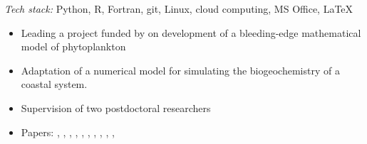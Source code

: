 \documentclass[
	a4paper,
]{fortysecondscv}
\begin{document}
{\Huge\color{maincolor}\cvname}
\vspace*{-10mm}

\cvsection{}
\begin{cvtable}[1.0]

	{\href{https://uol.de/en/icbm}{\color{pblue}{Uni. Oldenburg, Germany}}}
	{
	\textit{Tech stack:} Python, R, Fortran, git, Linux, cloud computing, MS Office, \LaTeX
	\begin{changemargin}{-45pt}{0pt}
	\begin{itemize}[topsep=0pt,itemsep=0pt,partopsep=0pt, parsep=0pt, leftmargin=*]
     \item Leading a project funded by \href{https://www.dfg.de/en}{\color{pblue}{DFG}} on development of a bleeding-edge mathematical model of phytoplankton %
     \item Adaptation of a numerical model for simulating the biogeochemistry of a coastal system.
     \item Supervision of two postdoctoral researchers
     \item Papers:
      \href{https://doi.org/10.1016/j.ecolmodel.2020.109401}{\color{pblue}{1}}, %
      \href{https://doi.org/10.1111/ele.13680}{\color{pblue}{2}},  %
      \href{https://doi.org/10.5194/gmd-14-6025-2021}{\color{pblue}{3}}, %
      \href{https://doi.org/10.3389/fmars.2021.675428}{\color{pblue}{4}}, %
      \href{https://doi.org/10.1002/lno.12005}{\color{pblue}{5}}, %
      \href{https://doi.org/10.3389/fmars.2022.975414}{\color{pblue}{6}}, %
      \href{https://doi.org/10.1101/2022.05.18.492269}{\color{pblue}{7}}, %
      \href{https://doi.org/10.1016/j.scitotenv.2022.158757}{\color{pblue}{8}}, %
      \href{https://doi.org/10.5194/gmd-16-95-2023}{\color{pblue}{9}}, %
      \href{https://doi.org/10.3389/fmars.2022.963325}{\color{pblue}{10}}, %

\end{itemize}
\end{changemargin}}
\end{cvtable}
\end{document}
